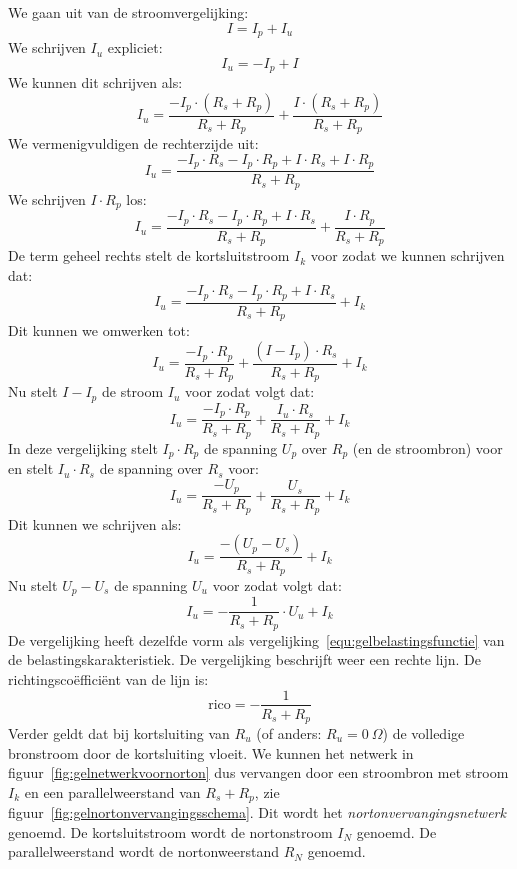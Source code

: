 We gaan uit van de stroomvergelijking:
%
\begin{equation}
I = I_p + I_u
\end{equation}
%
We schrijven $I_u$ expliciet:
%
\begin{equation}
I_u = -I_p + I
\end{equation}
%
We kunnen dit schrijven als:
%
\begin{equation}
I_u = \dfrac{-I_p\cdot(R_s+R_p)}{R_s+R_p} + \dfrac{I\cdot(R_s+R_p)}{R_s+R_p}
\end{equation}
%
We vermenigvuldigen de rechterzijde uit:
%
\begin{equation}
I_u = \dfrac{-I_p\cdot R_s -I_p\cdot R_p + I\cdot R_s + I\cdot R_p}{R_s+R_p}
\end{equation}
%
We schrijven $I\cdot R_p$ los:
%
\begin{equation}
I_u = \dfrac{-I_p\cdot R_s -I_p\cdot R_p + I\cdot R_s}{R_s+R_p} + \dfrac{I\cdot R_p}{R_s+R_p}
\end{equation}
%
De term geheel rechts stelt de kortsluitstroom $I_k$ voor zodat we kunnen schrijven dat:
%
\begin{equation}
I_u = \dfrac{-I_p\cdot R_s -I_p\cdot R_p + I\cdot R_s}{R_s+R_p} + I_k
\end{equation}
%
Dit kunnen we omwerken tot:
%
\begin{equation}
I_u = \dfrac{-I_p\cdot R_p}{R_s+R_p} + \dfrac{(I-I_p)\cdot R_s}{R_s+R_p} + I_k
\end{equation}
%
Nu stelt $I-I_p$ de stroom $I_u$ voor zodat volgt dat:
%
\begin{equation}
I_u = \dfrac{-I_p\cdot R_p}{R_s+R_p} + \dfrac{I_u\cdot R_s}{R_s+R_p} + I_k
\end{equation}
%
In deze vergelijking stelt $I_p\cdot R_p$ de spanning $U_p$ over $R_p$ (en de stroombron) voor en
stelt $I_u\cdot R_s$ de spanning over $R_s$ voor:
%
\begin{equation}
I_u = \dfrac{-U_p}{R_s+R_p} + \dfrac{U_s}{R_s+R_p} + I_k
\end{equation}
%
Dit kunnen we schrijven als:
\begin{equation}
I_u = \dfrac{-(U_p-U_s)}{R_s+R_p} + I_k
\end{equation}
%
Nu stelt $U_p-U_s$ de spanning $U_u$ voor zodat volgt dat:
%
\begin{equation}
I_u = -\dfrac{1}{R_s+R_p}\cdot U_u + I_k
\end{equation}
%
De vergelijking heeft dezelfde vorm als vergelijking~\eqref{equ:gelbelastingsfunctie} van de belastingskarakteristiek.
De vergelijking beschrijft weer een rechte lijn. De richtingsco\"effici\"ent van de lijn is:
%
\begin{equation}
\text{rico} = -\dfrac{1}{R_s+R_p}
\end{equation}
%
Verder geldt dat bij kortsluiting van $R_u$ (of anders: $R_u = 0\ \Omega$) de volledige bronstroom door
de kortsluiting vloeit. We kunnen het netwerk in figuur~\ref{fig:gelnetwerkvoornorton} dus vervangen door
een stroombron met stroom $I_k$ en een parallelweerstand van $R_s+R_p$, zie
figuur~\ref{fig:gelnortonvervangingsschema}. Dit wordt het \textsl{nortonvervangingsnetwerk} genoemd. De
kortsluitstroom wordt de nortonstroom $I_N$ genoemd. De parallelweerstand wordt de nortonweerstand $R_N$
genoemd. 

